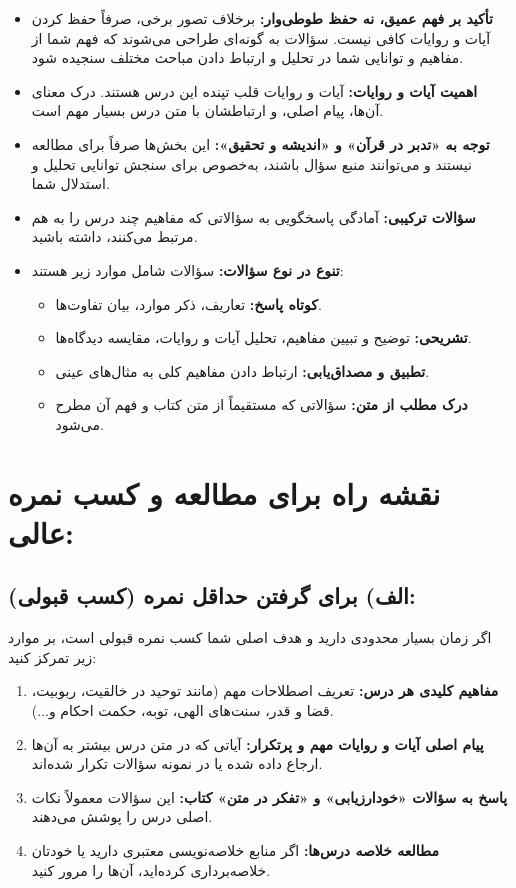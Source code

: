 \documentclass[11pt,a4paper]{article}
\begin{document}
\begin{itemize}
    \item \textbf{تأکید بر فهم عمیق، نه حفظ طوطی‌وار:} برخلاف تصور برخی، صرفاً حفظ کردن آیات و روایات کافی نیست. سؤالات به گونه‌ای طراحی می‌شوند که فهم شما از مفاهیم و توانایی شما در تحلیل و ارتباط دادن مباحث مختلف سنجیده شود.
    \item \textbf{اهمیت آیات و روایات:} آیات و روایات قلب تپنده این درس هستند. درک معنای آن‌ها، پیام اصلی، و ارتباطشان با متن درس بسیار مهم است.
    \item \textbf{توجه به «تدبر در قرآن» و «اندیشه و تحقیق»:} این بخش‌ها صرفاً برای مطالعه نیستند و می‌توانند منبع سؤال باشند، به‌خصوص برای سنجش توانایی تحلیل و استدلال شما.
    \item \textbf{سؤالات ترکیبی:} آمادگی پاسخگویی به سؤالاتی که مفاهیم چند درس را به هم مرتبط می‌کنند، داشته باشید.
    \item \textbf{تنوع در نوع سؤالات:} سؤالات شامل موارد زیر هستند:
    \begin{itemize}
        \item \textbf{کوتاه پاسخ:} تعاریف، ذکر موارد، بیان تفاوت‌ها.
        \item \textbf{تشریحی:} توضیح و تبیین مفاهیم، تحلیل آیات و روایات، مقایسه دیدگاه‌ها.
        \item \textbf{تطبیق و مصداق‌یابی:} ارتباط دادن مفاهیم کلی به مثال‌های عینی.
        \item \textbf{درک مطلب از متن:} سؤالاتی که مستقیماً از متن کتاب و فهم آن مطرح می‌شود.
    \end{itemize}
\end{itemize}

\section*{نقشه راه برای مطالعه و کسب نمره عالی:}

\subsection*{الف) برای گرفتن حداقل نمره (کسب قبولی):}

اگر زمان بسیار محدودی دارید و هدف اصلی شما کسب نمره قبولی است، بر موارد زیر تمرکز کنید:

\begin{enumerate}
    \item \textbf{مفاهیم کلیدی هر درس:} تعریف اصطلاحات مهم (مانند توحید در خالقیت، ربوبیت، قضا و قدر، سنت‌های الهی، توبه، حکمت احکام و...).
    \item \textbf{پیام اصلی آیات و روایات مهم و پرتکرار:} آیاتی که در متن درس بیشتر به آن‌ها ارجاع داده شده یا در نمونه سؤالات تکرار شده‌اند.
    \item \textbf{پاسخ به سؤالات «خودارزیابی» و «تفکر در متن» کتاب:} این سؤالات معمولاً نکات اصلی درس را پوشش می‌دهند.
    \item \textbf{مطالعه خلاصه درس‌ها:} اگر منابع خلاصه‌نویسی معتبری دارید یا خودتان خلاصه‌برداری کرده‌اید، آن‌ها را مرور کنید.
\end{enumerate}
\end{document}
